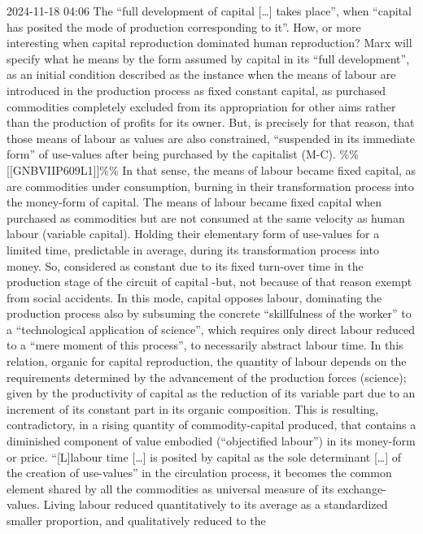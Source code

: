 \documentclass[
]{article}
\author{}
\date{}
\begin{document}
2024-11-18 04:06 The ``full development of capital {[}\ldots{]} takes
place'', when ``capital has posited the mode of production corresponding
to it''. How, or more interesting when capital reproduction dominated
human reproduction? Marx will specify what he means by the form assumed
by capital in its ``full development'', as an initial condition
described as the instance when the means of labour are introduced in the
production process as fixed constant capital, as purchased commodities
completely excluded from its appropriation for other aims rather than
the production of profits for its owner. But, is precisely for that
reason, that those means of labour as values are also constrained,
``suspended in its immediate form'' of use-values after being purchased
by the capitalist (M-C). \%\%{[}{[}GNBVIIP609L1{]}{]}\%\% In that sense,
the means of labour became fixed capital, as are commodities under
consumption, burning in their transformation process into the money-form
of capital. The means of labour became fixed capital when purchased as
commodities but are not consumed at the same velocity as human labour
(variable capital). Holding their elementary form of use-values for a
limited time, predictable in average, during its transformation process
into money. So, considered as constant due to its fixed turn-over time
in the production stage of the circuit of capital -but, not because of
that reason exempt from social accidents. In this mode, capital opposes
labour, dominating the production process also by subsuming the concrete
``skillfulness of the worker'' to a ``technological application of
science'', which requires only direct labour reduced to a ``mere moment
of this process'', to necessarily abstract labour time. In this
relation, organic for capital reproduction, the quantity of labour
depends on the requirements determined by the advancement of the
production forces (science); given by the productivity of capital as the
reduction of its variable part due to an increment of its constant part
in its organic composition. This is resulting, contradictory, in a
rising quantity of commodity-capital produced, that contains a
diminished component of value embodied (``objectified labour'') in its
money-form or price. ``{[}L{]}labour time {[}\ldots{]} is posited by
capital as the sole determinant {[}\ldots{]} of the creation of
use-values'' in the circulation process, it becomes the common element
shared by all the commodities as universal measure of its
exchange-values. Living labour reduced quantitatively to its average as
a standardized smaller proportion, and qualitatively reduced to the
\end{document}
